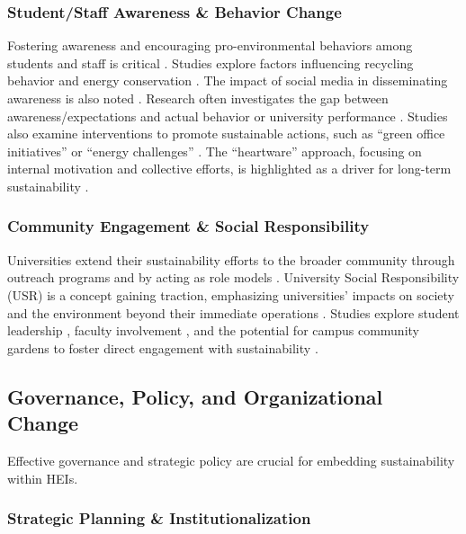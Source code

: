 \documentclass[12pt,a4paper]{article}
\begin{document}
\subsubsection{Student/Staff Awareness \& Behavior Change}

Fostering awareness and encouraging pro-environmental behaviors among students and staff is critical \citep{Setiawati2021, Alalawi2024}. Studies explore factors influencing recycling behavior and energy conservation \citep{Thoo2022, Ishak2016}. The impact of social media in disseminating awareness is also noted \citep{Hamid2017}. Research often investigates the gap between awareness/expectations and actual behavior or university performance \citep{Dagiliute2018, Zhao2023, Yasin2024}. Studies also examine interventions to promote sustainable actions, such as ``green office initiatives'' \citep{Zen2016} or ``energy challenges'' \citep{Boulton2017}. The ``heartware'' approach, focusing on internal motivation and collective efforts, is highlighted as a driver for long-term sustainability \citep{Mohamad2018}.

\subsubsection{Community Engagement \& Social Responsibility}

Universities extend their sustainability efforts to the broader community through outreach programs and by acting as role models \citep{Fatah2025}. University Social Responsibility (USR) is a concept gaining traction, emphasizing universities' impacts on society and the environment beyond their immediate operations \citep{Gomez2018, AriasValle2024}. Studies explore student leadership \citep{Mohamed2025}, faculty involvement \citep{Alali2024}, and the potential for campus community gardens to foster direct engagement with sustainability \citep{DeYoung2016, Dantas2018}.

\subsection{Governance, Policy, and Organizational Change}

Effective governance and strategic policy are crucial for embedding sustainability within HEIs.

\subsubsection{Strategic Planning \& Institutionalization}
\end{document}
